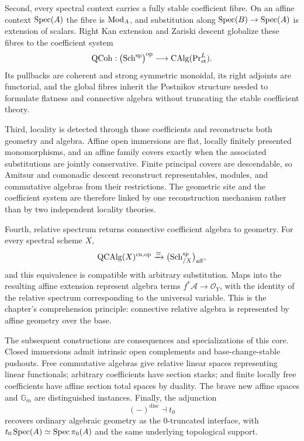 Second, every spectral context carries a fully stable coefficient fibre. On
an affine context \(\operatorname{Spec}(A)\) the fibre is \(\operatorname{Mod}_A\), and substitution
along \(\operatorname{Spec}(B)\to\operatorname{Spec}(A)\) is extension of scalars. Right Kan extension
and Zariski descent globalize these fibres to the coefficient system
\[
    \operatorname{QCoh}
    :
    \bigl(\operatorname{Sch}^{\mathrm{sp}}\bigr)^{\mathrm{op}}
    \longrightarrow
    \operatorname{CAlg}(\operatorname{Pr}^L_{\mathrm{st}}).
\]
Its pullbacks are coherent and strong symmetric monoidal, its right adjoints
are functorial, and the global fibres inherit the Postnikov structure needed
to formulate flatness and connective algebra without truncating the stable
coefficient theory.

Third, locality is detected through those coefficients and reconstructs both
geometry and algebra. Affine open immersions are flat, locally finitely
presented monomorphisms, and an affine family covers exactly when the
associated substitutions are jointly conservative. Finite principal covers
are descendable, so Amitsur and comonadic descent reconstruct representables,
modules, and commutative algebras from their restrictions. The geometric site
and the coefficient system are therefore linked by one reconstruction
mechanism rather than by two independent locality theories.

Fourth, relative spectrum returns connective coefficient algebra to geometry.
For every spectral scheme \(X\),
\[
    \operatorname{QCAlg}(X)^{\mathrm{cn},\mathrm{op}}
    \xrightarrow{\simeq}
    \bigl(\operatorname{Sch}^{\mathrm{sp}}_{/X}\bigr)_{\mathrm{aff}},
\]
and this equivalence is compatible with arbitrary substitution. Maps into the
resulting affine extension represent algebra terms
\(f^*\mathcal A\to\mathcal O_Y\), with the identity of the relative spectrum
corresponding to the universal variable. This is the chapter's comprehension
principle: connective relative algebra is represented by affine geometry over
the base.

The subsequent constructions are consequences and specializations of this
core. Closed immersions admit intrinsic open complements and
base-change-stable pushouts. Free commutative algebras give relative linear
spaces representing linear functionals; arbitrary coefficients have section
stacks; and finite locally free coefficients have affine section total spaces
by duality. The brave new affine spaces and \(\mathbb G_m\) are distinguished
instances. Finally, the adjunction
\[
    (-)^{\mathrm{disc}}
    \dashv
    t_0
\]
recovers ordinary algebraic geometry as the \(0\)-truncated interface, with
\(t_0\operatorname{Spec}(A)\simeq\operatorname{Spec}\pi_0(A)\) and the same underlying topological
support.

